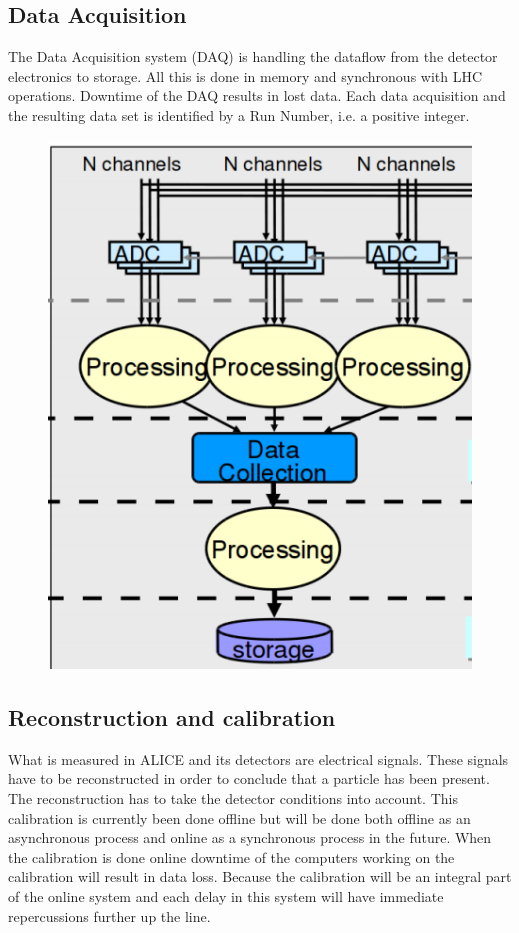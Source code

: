 \subsection{Data Acquisition}
The Data Acquisition system (DAQ) is handling the dataflow from the detector electronics to storage. All this is done in memory and synchronous with LHC operations. Downtime of the DAQ results in lost data. Each data acquisition and the resulting data set is identified by a Run Number, i.e. a positive integer.

\begin{figure}
  \begin{center}
    \includegraphics[scale=0.3]{./images/daq.png}
    \caption{}
    \label{fig:}
  \end{center}
\end{figure}

\subsection{Reconstruction and calibration}
What is measured in ALICE and its detectors are electrical signals. These signals have to be reconstructed in order to conclude that a particle has been present. The reconstruction has to take the detector conditions into account. This calibration is currently been done offline but will be done both offline as an asynchronous process and online as a synchronous process in the future. When the calibration is done online downtime of the computers working on the calibration will result in data loss. Because the calibration will be an integral part of the online system and each delay in this system will have immediate repercussions further up the line.

